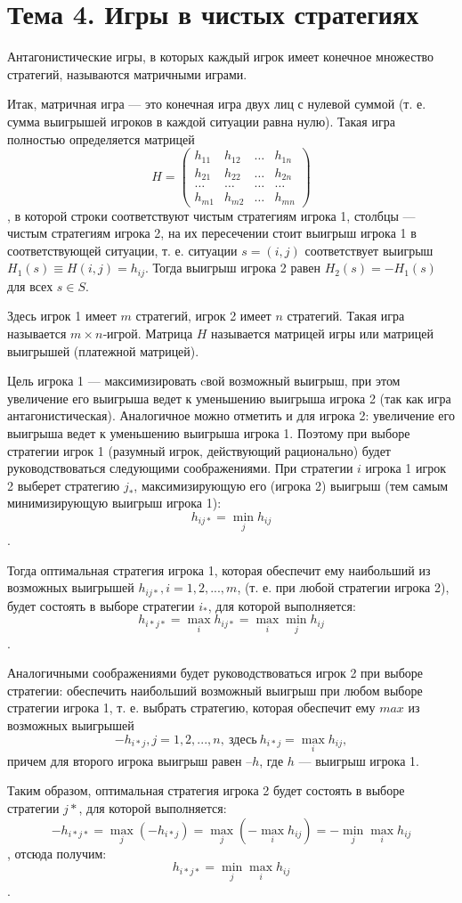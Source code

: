 \section{Тема 4. Игры в чистых стратегиях}

Антагонистические игры, в которых каждый игрок имеет конечное множество стратегий, называются матричными играми.

Итак, матричная игра --- это конечная игра двух лиц с нулевой суммой (т. е. сумма выигрышей игроков в каждой ситуации равна нулю). Такая игра полностью определяется матрицей
\[ H = \begin{pmatrix}
h_{11} & h_{12} & \dots & h_{1n} \\ 
h_{21} & h_{22} & \dots & h_{2n} \\ 
\dots & \dots & \dots & \dots \\ 
h_{m1} & h_{m2} & \dots & h_{mn}
\end{pmatrix}  \],
в которой строки соответствуют чистым стратегиям игрока 1, столбцы --- чистым стратегиям игрока 2, на их пересечении стоит выигрыш игрока 1 в соответствующей ситуации, т. е. ситуации $s = (i, j)$ соответствует выигрыш $H_1(s) \equiv H (i, j) =  h_{ij}$. Тогда выигрыш игрока 2 равен $H_2(s) = - H_1(s)$ для всех $s \in S$.

Здесь игрок 1 имеет $m$ стратегий, игрок 2 имеет $n$ стратегий. Такая игра называется $m\times n$‑игрой. Матрица $H$ называется матрицей игры или матрицей выигрышей (платежной матрицей).

Цель игрока 1 --- максимизировать cвой возможный выигрыш, при этом увеличение его выигрыша ведет к уменьшению выигрыша игрока 2 (так как игра антагонистическая). Аналогичное можно отметить и для игрока 2: увеличение его выигрыша ведет к уменьшению выигрыша игрока 1. Поэтому при выборе стратегии игрок 1 (разумный игрок, действующий рационально) будет руководствоваться следующими соображениями. При стратегии $i$ игрока 1 игрок 2 выберет стратегию $j_*$, максимизирующую его (игрока 2) выигрыш (тем самым минимизирующую выигрыш игрока 1):
\[ h_{ij*} = \min_j h_{ij}\].

Тогда оптимальная стратегия игрока 1, которая обеспечит ему наибольший из возможных выигрышей $h_{ij*}, i = 1, 2, ..., m$, (т. е. при любой стратегии игрока 2), будет состоять в выборе стратегии $i_*$, для которой выполняется:
\[ h_{i*j*} = \max_i h_{ij*} = \max_i \min_j h_{ij} \].

Аналогичными соображениями будет руководствоваться игрок 2 при выборе стратегии: обеспечить наибольший возможный выигрыш при любом выборе стратегии игрока 1, т. е. выбрать стратегию, которая обеспечит ему $max$ из возможных выигрышей
\[ -h_{i*j},j = 1, 2,..., n, \ \text{здесь} \ h_{i*j} = \max_i h_{ij}, \]
причем для второго игрока выигрыш равен $–h$, где $h$ --- выигрыш игрока 1.

Таким образом, оптимальная стратегия игрока 2 будет состоять в выборе стратегии $j*$, для которой выполняется:
\[ -h _{i*j*} = \max_j (-h_{i*j}) = \max_j (-\max_i h_{ij}) = - \min_j \max_i h_{ij} \],
отсюда получим:
\[h_{i*j*} = \min_j \max_i h_{ij}\].